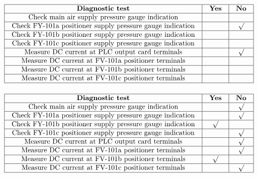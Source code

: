 $$\vbox{\offinterlineskip
\halign{\strut
\vrule \quad\hfil # \ \hfil & 
\vrule \quad\hfil # \ \hfil & 
\vrule \quad\hfil # \ \hfil \vrule \cr
\noalign{\hrule}
%
{\bf Diagnostic test} & {\bf Yes} & {\bf No} \cr
%
\noalign{\hrule}
%
Check main air supply pressure gauge indication &  &  \cr
%
\noalign{\hrule}
%
Check FY-101a positioner supply pressure gauge indication &  & $\surd$ \cr
%
\noalign{\hrule}
%
Check FY-101b positioner supply pressure gauge indication &  &  \cr
%
\noalign{\hrule}
%
Check FY-101c positioner supply pressure gauge indication &  &  \cr
%
\noalign{\hrule}
%
Measure DC current at PLC output card terminals &  & $\surd$ \cr
%
\noalign{\hrule}
%
Measure DC current at FV-101a positioner terminals &  &  \cr
%
\noalign{\hrule}
%
Measure DC current at FV-101b positioner terminals &  &  \cr
%
\noalign{\hrule}
%
Measure DC current at FV-101c positioner terminals &  &  \cr
%
\noalign{\hrule}
} %
}$$ %








$$\vbox{\offinterlineskip
\halign{\strut
\vrule \quad\hfil # \ \hfil & 
\vrule \quad\hfil # \ \hfil & 
\vrule \quad\hfil # \ \hfil \vrule \cr
\noalign{\hrule}
%
{\bf Diagnostic test} & {\bf Yes} & {\bf No} \cr
%
\noalign{\hrule}
%
Check main air supply pressure gauge indication &  & $\surd$ \cr
%
\noalign{\hrule}
%
Check FY-101a positioner supply pressure gauge indication &  & $\surd$ \cr
%
\noalign{\hrule}
%
Check FY-101b positioner supply pressure gauge indication & $\surd$ &  \cr
%
\noalign{\hrule}
%
Check FY-101c positioner supply pressure gauge indication &  & $\surd$ \cr
%
\noalign{\hrule}
%
Measure DC current at PLC output card terminals &  & $\surd$ \cr
%
\noalign{\hrule}
%
Measure DC current at FV-101a positioner terminals &  & $\surd$ \cr
%
\noalign{\hrule}
%
Measure DC current at FV-101b positioner terminals & $\surd$ &  \cr
%
\noalign{\hrule}
%
Measure DC current at FV-101c positioner terminals &  & $\surd$ \cr
%
\noalign{\hrule}
} %
}$$ %


